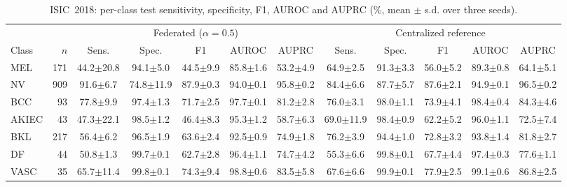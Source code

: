\begin{table}[!t]
\caption{ISIC~2018: per-class test sensitivity, specificity, F1, AUROC and AUPRC (\%, mean $\pm$ s.d. over three seeds).}
\label{tab:18-perclass}
\centering
\footnotesize
\setlength{\tabcolsep}{3.2pt}
\begin{tabular}{lrcccccccccc}
\toprule
 & & \multicolumn{5}{c}{Federated ($\alpha{=}0.5$)} & \multicolumn{5}{c}{Centralized reference} \\
\cmidrule(lr){3-7}\cmidrule(lr){8-12}
Class & $n$ & Sens. & Spec. & F1 & AUROC & AUPRC & Sens. & Spec. & F1 & AUROC & AUPRC \\
\midrule
MEL & 171 & 44.2$\pm$20.8 & 94.1$\pm$5.0 & 44.5$\pm$9.9 & 85.8$\pm$1.6 & 53.2$\pm$4.9 & 64.9$\pm$2.5 & 91.3$\pm$3.3 & 56.0$\pm$5.2 & 89.3$\pm$0.8 & 64.1$\pm$5.1 \\
NV & 909 & 91.6$\pm$6.7 & 74.8$\pm$11.9 & 87.9$\pm$0.3 & 94.0$\pm$0.1 & 95.8$\pm$0.2 & 84.4$\pm$6.6 & 87.7$\pm$5.7 & 87.6$\pm$2.1 & 94.9$\pm$0.1 & 96.5$\pm$0.2 \\
BCC & 93 & 77.8$\pm$9.9 & 97.4$\pm$1.3 & 71.7$\pm$2.5 & 97.7$\pm$0.1 & 81.2$\pm$2.8 & 76.0$\pm$3.1 & 98.0$\pm$1.1 & 73.9$\pm$4.1 & 98.4$\pm$0.4 & 84.3$\pm$4.6 \\
AKIEC & 43 & 47.3$\pm$22.1 & 98.5$\pm$1.2 & 46.4$\pm$8.3 & 95.3$\pm$1.2 & 58.7$\pm$6.3 & 69.0$\pm$11.9 & 98.4$\pm$0.9 & 62.2$\pm$5.2 & 96.0$\pm$1.1 & 72.5$\pm$7.4 \\
BKL & 217 & 56.4$\pm$6.2 & 96.5$\pm$1.9 & 63.6$\pm$2.4 & 92.5$\pm$0.9 & 74.9$\pm$1.8 & 76.2$\pm$3.9 & 94.4$\pm$1.0 & 72.8$\pm$3.2 & 93.8$\pm$1.4 & 81.8$\pm$2.7 \\
DF & 44 & 50.8$\pm$1.3 & 99.7$\pm$0.1 & 62.7$\pm$2.8 & 96.4$\pm$1.1 & 74.7$\pm$4.2 & 55.3$\pm$6.6 & 99.8$\pm$0.1 & 67.7$\pm$4.4 & 97.4$\pm$0.3 & 77.6$\pm$1.1 \\
VASC & 35 & 65.7$\pm$11.4 & 99.8$\pm$0.1 & 74.3$\pm$9.4 & 98.8$\pm$0.6 & 83.5$\pm$5.8 & 67.6$\pm$6.6 & 99.9$\pm$0.1 & 77.9$\pm$2.5 & 99.1$\pm$0.6 & 86.8$\pm$2.5 \\
\bottomrule
\end{tabular}
\end{table}